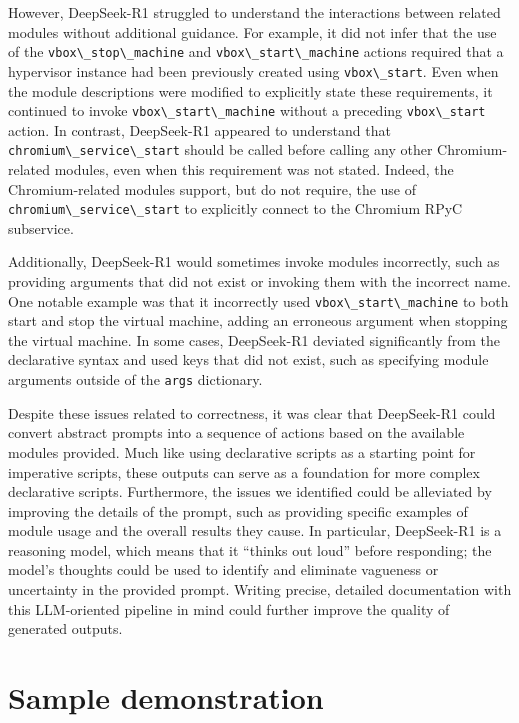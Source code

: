However, DeepSeek-R1 struggled to understand the interactions between
related modules without additional guidance. For example, it did not
infer that the use of the \passthrough{\lstinline!vbox\_stop\_machine!}
and \passthrough{\lstinline!vbox\_start\_machine!} actions required that
a hypervisor instance had been previously created using
\passthrough{\lstinline!vbox\_start!}. Even when the module descriptions
were modified to explicitly state these requirements, it continued to
invoke \passthrough{\lstinline!vbox\_start\_machine!} without a
preceding \passthrough{\lstinline!vbox\_start!} action. In contrast,
DeepSeek-R1 appeared to understand that
\passthrough{\lstinline!chromium\_service\_start!} should be called
before calling any other Chromium-related modules, even when this
requirement was not stated. Indeed, the Chromium-related modules
support, but do not require, the use of
\passthrough{\lstinline!chromium\_service\_start!} to explicitly connect
to the Chromium RPyC subservice.

Additionally, DeepSeek-R1 would sometimes invoke modules incorrectly,
such as providing arguments that did not exist or invoking them with the
incorrect name. One notable example was that it incorrectly used
\passthrough{\lstinline!vbox\_start\_machine!} to both start and stop
the virtual machine, adding an erroneous argument when stopping the
virtual machine. In some cases, DeepSeek-R1 deviated significantly from
the declarative syntax and used keys that did not exist, such as
specifying module arguments outside of the
\passthrough{\lstinline!args!} dictionary.

Despite these issues related to correctness, it was clear that
DeepSeek-R1 could convert abstract prompts into a sequence of actions
based on the available modules provided. Much like using declarative
scripts as a starting point for imperative scripts, these outputs can
serve as a foundation for more complex declarative scripts. Furthermore,
the issues we identified could be alleviated by improving the details of
the prompt, such as providing specific examples of module usage and the
overall results they cause. In particular, DeepSeek-R1 is a reasoning
model, which means that it ``thinks out loud'' before responding; the
model's thoughts could be used to identify and eliminate vagueness or
uncertainty in the provided prompt. Writing precise, detailed
documentation with this LLM-oriented pipeline in mind could further
improve the quality of generated outputs.

\section{Sample demonstration}\label{sample-demonstration}

